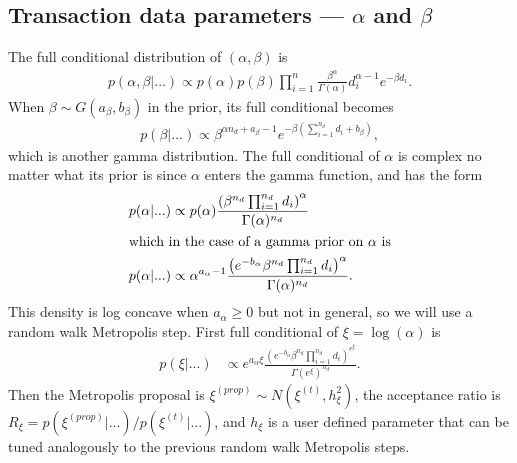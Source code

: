 \documentclass{article}
\begin{document}
\subsection{Transaction data parameters --- $\alpha$ and $\beta$}
The full conditional distribution of $(\alpha,\beta)$ is 
\begin{align*}
p(\alpha,\beta|...) \propto p(\alpha)p(\beta) \prod_{i=1}^{n}\frac{\beta^{\alpha}}{\Gamma(\alpha)}d_i^{\alpha - 1}e^{-\beta d_i}.
\end{align*}
When $\beta \sim G(a_\beta, b_\beta)$ in the prior, its full conditional becomes
\begin{align*}
p(\beta|...) \propto \beta^{\alpha n_d + a_{\beta} - 1}e^{-\beta\left(\sum_{i=1}^{n_d}d_i + b_{\beta}\right)},
\end{align*}
which is another gamma distribution. The full conditional of $\alpha$ is complex no matter what its prior is since $\alpha$ enters the gamma function, and has the form
\begin{align*}
p(\alpha|...) &\propto p(\alpha)\frac{\left(\beta^{n_d}\prod_{i=1}^{n_d}d_i\right)^{\alpha}}{\Gamma(\alpha)^{n_d}}\\
\intertext{which in the case of a gamma prior on $\alpha$ is}
p(\alpha|...) &\propto \alpha^{a_\alpha - 1}\frac{\left(e^{-b_\alpha}\beta^{n_d}\prod_{i=1}^{n_d}d_i\right)^{\alpha}}{\Gamma(\alpha)^{n_d}}.
\end{align*}
This density is log concave when $a_\alpha \ge 0$ but not in general, so we will use a random walk Metropolis step. First full conditional of $\xi = \log(\alpha)$ is
\begin{align*}
p(\xi|...) &\propto e^{a_\alpha\xi}\frac{\left(e^{-b_\alpha}\beta^{n_d}\prod_{i=1}^{n_d}d_i\right)^{e^{\xi}}}{\Gamma(e^{\xi})^{n_d}}.
\end{align*}
Then the Metropolis proposal is $\xi^{(prop)}\sim N(\xi^{(t)},h_{\xi}^2)$, the acceptance ratio is $R_{\xi} = p(\xi^{(prop)}|...)/p(\xi^{(t)}|...)$, and $h_{\xi}$ is a user defined parameter that can be tuned analogously to the previous random walk Metropolis steps.
 

\end{document}
